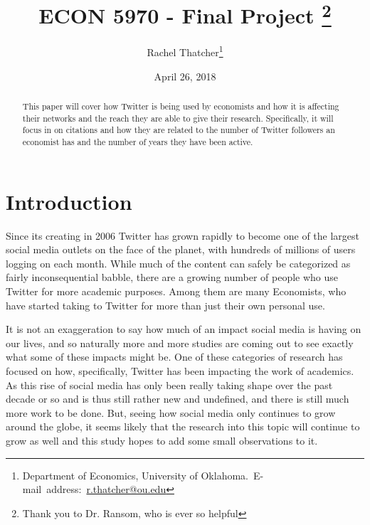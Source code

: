 \documentclass[12pt, Times New Roman]{article}
\begin{document}
\begin{singlespace}
\title{ECON 5970 - Final Project \thanks{Thank you to Dr. Ransom, who is ever so helpful}}
\end{singlespace}

\author{Rachel Thatcher\thanks{Department of Economics, University of Oklahoma.\
E-mail~address:~\href{mailto:r.thatcher@ou.edu}{r.thatcher@ou.edu}}}

\date{April 26, 2018}

\maketitle

\begin{abstract}
\begin{singlespace}
This paper will cover how Twitter is being used by economists and how it is affecting their networks and the reach they are able to give their research. Specifically, it will focus in on citations and how they are related to the number of Twitter followers an economist has and the number of years they have been active. 

\end{singlespace}

\end{abstract}
\vfill{}


\pagebreak{}


\section*{Introduction}\label{sec:intro}
\setlength{\parindent}{10ex}


Since its creating in 2006 Twitter has grown rapidly to become one of the largest social media outlets on the face of the planet, with hundreds of millions of users logging on each month. While much of the content can safely be categorized as fairly inconsequential babble, there are a growing number of people who use Twitter for more academic purposes. Among them are many Economists, who have started taking to Twitter for more than just their own personal use. 

It is not an exaggeration to say how much of an impact social media is having on our lives, and so naturally more and more studies are coming out to see exactly what some of these impacts might be. One of these categories of research has focused on how, specifically, Twitter has been impacting the work of academics. As this rise of social media has only been really taking shape over the past decade or so and is thus still rather new and undefined, and there is still much more work to be done. But, seeing how social media only continues to grow around the globe, it seems likely that the research into this topic will continue to grow as well and this study hopes to add some small observations to it. 
\end{document}
